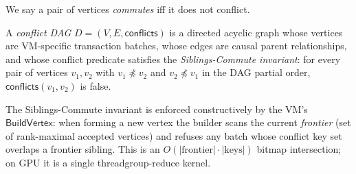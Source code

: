 We say a pair of vertices \emph{commutes} iff it does not conflict.

\begin{definition}
A \emph{conflict DAG} $D = (V, E, \mathsf{conflicts})$ is a directed acyclic
graph whose vertices are VM-specific transaction batches, whose edges are
causal parent relationships, and whose conflict predicate satisfies the
\emph{Siblings-Commute invariant}: for every pair of vertices $v_1, v_2$
with $v_1 \not\preceq v_2$ and $v_2 \not\preceq v_1$ in the DAG partial
order, $\mathsf{conflicts}(v_1, v_2)$ is false.
\end{definition}

The Siblings-Commute invariant is enforced constructively by the VM's
$\mathsf{BuildVertex}$: when forming a new vertex the builder scans the
current \emph{frontier} (set of rank-maximal accepted vertices) and refuses
any batch whose conflict key set overlaps a frontier sibling. This is an
$O(|\text{frontier}| \cdot |\text{keys}|)$ bitmap intersection; on GPU it
is a single threadgroup-reduce kernel.

